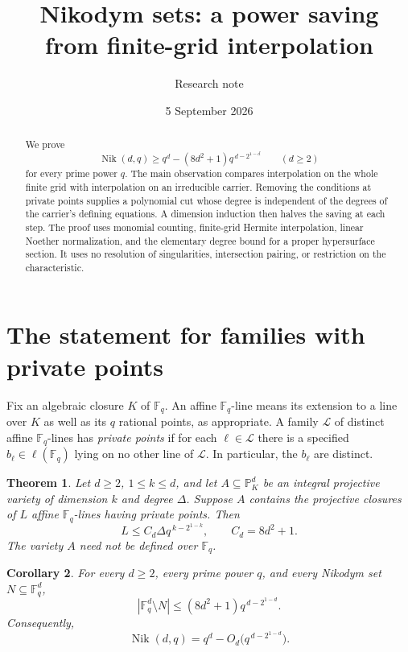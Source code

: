 \documentclass[11pt]{article}
\title{Nikodym sets: a power saving\\from finite-grid interpolation}
\author{Research note}
\date{5 September 2026}
\newcommand{\F}{\mathbb F}
\newcommand{\PP}{\mathbb P}
\newcommand{\Nik}{\operatorname{Nik}}
\newtheorem{theorem}{Theorem}
\newtheorem{corollary}[theorem]{Corollary}
\theoremstyle{remark}
\begin{document}
\maketitle

\begin{abstract}
We prove
\[
 \Nik(d,q)\ge q^d-(8d^2+1)q^{\,d-2^{1-d}}
 \qquad(d\ge2)
\]
for every prime power $q$. The main observation compares interpolation
on the whole finite grid with interpolation on an irreducible carrier.
Removing the conditions at private points supplies a polynomial cut
whose degree is independent of the degrees of the carrier's defining
equations. A dimension induction then halves the saving at each step.
The proof uses monomial counting, finite-grid Hermite interpolation,
linear Noether normalization, and the elementary degree bound for a
proper hypersurface section. It uses no resolution of singularities,
intersection pairing, or restriction on the characteristic.
\end{abstract}

\section{The statement for families with private points}

Fix an algebraic closure $K$ of $\F_q$. An affine $\F_q$-line
means its extension to a line over $K$ as well as its $q$ rational
points, as appropriate. A family $\mathcal L$ of distinct affine
$\F_q$-lines has \emph{private points} if for each $\ell\in\mathcal L$
there is a specified $b_\ell\in\ell(\F_q)$ lying on no other line of
$\mathcal L$. In particular, the $b_\ell$ are distinct.

\begin{theorem}\label{thm:carrier}
Let $d\ge2$, $1\le k\le d$, and let $A\subseteq\PP^d_K$ be an
integral projective variety of dimension $k$ and degree $\Delta$.
Suppose $A$ contains the projective closures of $L$ affine
$\F_q$-lines having private points. Then
\begin{equation}\label{eq:carrier}
 L\le C_d\Delta q^{\,k-2^{1-k}},
 \qquad C_d=8d^2+1.
\end{equation}
The variety $A$ need not be defined over $\F_q$.
\end{theorem}

\begin{corollary}\label{cor:nikodym}
For every $d\ge2$, every prime power $q$, and every Nikodym set
$N\subseteq\F_q^d$,
\begin{equation}\label{eq:main}
 |\F_q^d\setminus N|\le (8d^2+1)q^{\,d-2^{1-d}}.
\end{equation}
Consequently,
\[
 \Nik(d,q)=q^d-O_d\bigl(q^{\,d-2^{1-d}}\bigr).
\]
\end{corollary}
\end{document}
